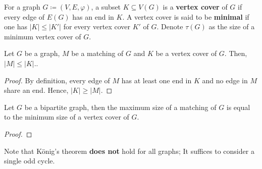 \begin{definition}
	\label{def:vertex_cover}
	For a graph \(G \coloneqq (V, E, \varphi)\), a subset \(K \subseteq V(G)\) is a \textbf{vertex cover} of \(G\) if every edge of \(E(G)\) has an end in \(K\). 
	A vertex cover is said to be \textbf{minimal} if one has \(|K| \leq |K'|\) for every vertex cover \(K'\) of \(G\).
	Denote \(\tau(G)\) as the size of a minimum vertex cover of \(G\).
\end{definition}

\begin{corollary}
	\label{cor:match_upperbound}
	Let \(G\) be a graph, \(M\) be a matching of \(G\) and \(K\) be a vertex cover of \(G\). 
	Then, \(|M| \leq |K|\)..
\end{corollary}

\begin{proof}
	By definition, every edge of \(M\) has at least one end in \(K\) and no edge in \(M\) share an end.
	Hence, \(|K| \geq |M|\).
\end{proof}

\begin{theorem}
	\label{thm:konig}
	Let \(G\) be a bipartite graph, then the maximum size of a matching of \(G\) is equal to the minimum size of a vertex cover of \(G\).
\end{theorem}

\begin{proof}
\end{proof}

Note that K\"onig's theorem \textbf{does not} hold for all graphs;
It suffices to consider a single odd cycle.

